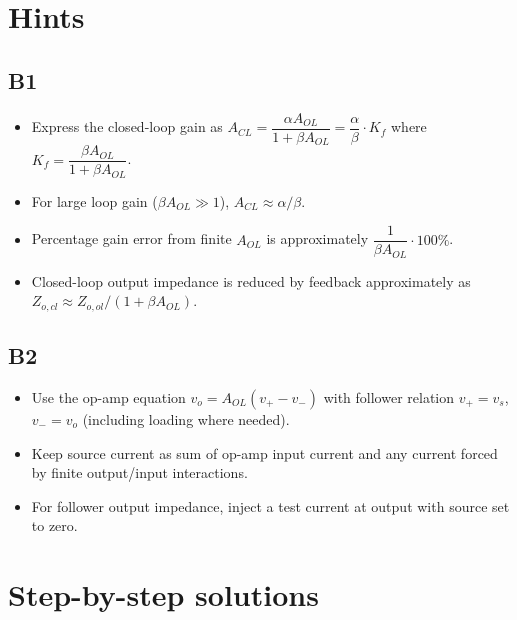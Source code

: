 \documentclass[12pt,a4paper]{article}
\begin{document}
\section{Hints}
\subsection{B1}
\begin{itemize}
\item Express the closed-loop gain as $A_{CL}=\dfrac{\alpha A_{OL}}{1+\beta A_{OL}}=\dfrac{\alpha}{\beta}\cdot K_f$ where $K_f=\dfrac{\beta A_{OL}}{1+\beta A_{OL}}$.
\item For large loop gain ($\beta A_{OL}\gg 1$), $A_{CL}\approx \alpha/\beta$.
\item Percentage gain error from finite $A_{OL}$ is approximately $\dfrac{1}{\beta A_{OL}}\cdot100\%$.
\item Closed-loop output impedance is reduced by feedback approximately as $Z_{o,cl}\approx Z_{o,ol}/(1+\beta A_{OL})$.
\end{itemize}

\subsection{B2}
\begin{itemize}
\item Use the op-amp equation $v_o=A_{OL}(v_+-v_-)$ with follower relation $v_+=v_s$, $v_-=v_o$ (including loading where needed).
\item Keep source current as sum of op-amp input current and any current forced by finite output/input interactions.
\item For follower output impedance, inject a test current at output with source set to zero.
\end{itemize}

\section{Step-by-step solutions}
\end{document}
